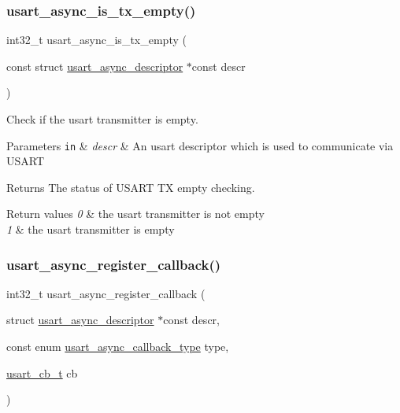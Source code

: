 \subsubsection{\texorpdfstring{usart\+\_\+async\+\_\+is\+\_\+tx\+\_\+empty()}{usart\_async\_is\_tx\_empty()}}
{\footnotesize\ttfamily int32\+\_\+t usart\+\_\+async\+\_\+is\+\_\+tx\+\_\+empty (\begin{DoxyParamCaption}\item[{const struct \hyperlink{structusart__async__descriptor}{usart\+\_\+async\+\_\+descriptor} $\ast$const}]{descr }\end{DoxyParamCaption})}



Check if the usart transmitter is empty. 


\begin{DoxyParams}[1]{Parameters}
\mbox{\tt in}  & {\em descr} & An usart descriptor which is used to communicate via U\+S\+A\+RT\\
\hline
\end{DoxyParams}
\begin{DoxyReturn}{Returns}
The status of U\+S\+A\+RT TX empty checking. 
\end{DoxyReturn}

\begin{DoxyRetVals}{Return values}
{\em 0} & the usart transmitter is not empty \\
\hline
{\em 1} & the usart transmitter is empty \\
\hline
\end{DoxyRetVals}
\mbox{\label{group__doc__driver__hal__usart__async_ga2d7d4ba3ab10f19c2e8a7901f2b6b276}} 
\subsubsection{\texorpdfstring{usart\+\_\+async\+\_\+register\+\_\+callback()}{usart\_async\_register\_callback()}}
{\footnotesize\ttfamily int32\+\_\+t usart\+\_\+async\+\_\+register\+\_\+callback (\begin{DoxyParamCaption}\item[{struct \hyperlink{structusart__async__descriptor}{usart\+\_\+async\+\_\+descriptor} $\ast$const}]{descr,  }\item[{const enum \hyperlink{group__doc__driver__hal__usart__async_ga5a82ef383f62daa061a55838c8fc6d39}{usart\+\_\+async\+\_\+callback\+\_\+type}}]{type,  }\item[{\hyperlink{group__doc__driver__hal__usart__async_ga430e4080a53e1f39c4d46da01200f633}{usart\+\_\+cb\+\_\+t}}]{cb }\end{DoxyParamCaption})}




